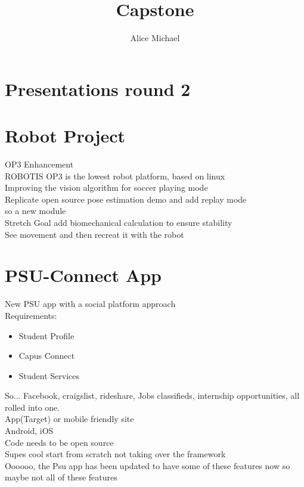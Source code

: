 \chead{}
\author{Alice Michael}
\title{Capstone}
\date{}






\section*{Presentations round 2}

\section*{Robot Project}
\noindent OP3 Enhancement\\
ROBOTIS OP3 is the lowest robot platform, based on linux\\
Improving the vision algorithm for soccer playing mode\\
Replicate open source pose estimation demo and add replay mode\\
\indent\indent\arr so a new module\\
Stretch Goal \arr add biomechanical calculation to ensure stability\\
See movement and then recreat it with the robot\\

\section*{PSU-Connect App}
New PSU app with a social platform approach\\
Requirements:
\begin{itemize}
  \itemsep-1.5em
  \item Student Profile\\
  \item Capus Connect\\
  \item Student Services\\
\end{itemize}
\noindent So...  Facebook, craigslist, rideshare, Jobs classifieds, internship opportunities, all rolled into one.\\
App(Target) or mobile friendly site\\
Android, iOS\\
Code needs to be open source\\
Supes cool start from scratch not taking over the framework\\
Oooooo, the Psu app has been updated to have some of these features now so maybe not all of these features\\

